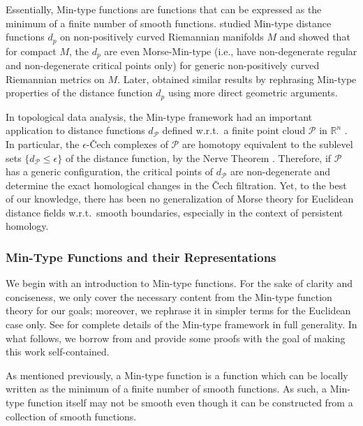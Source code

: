 \documentclass[11pt]{article}
\newcommand{\R}{\mathbb{R}}
\newcommand{\eps}{\epsilon}
\theoremstyle{plain}
\theoremstyle{definition}
\theoremstyle{remark}
\begin{document}
	Essentially, Min-type functions are functions that can be expressed as the minimum of a finite number of smooth functions.
	\cite{gershkovich_morse_1997} studied Min-type distance functions $d_p$ on non-positively curved Riemannian manifolds $M$ and showed that for compact $M$, the $d_p$ are even Morse-Min-type (i.e., have non-degenerate regular and non-degenerate critical points only) for generic non-positively curved Riemannian metrics on $M$.
	Later, \cite{itoh_cut_2007} obtained similar results by rephrasing Min-type properties of the distance function $d_p$ using more direct geometric arguments.
	
	In topological data analysis, the Min-type framework had an important application to distance functions $d_{\mathcal{P}}$ defined w.r.t.~a finite point cloud $\mathcal{P}$ in  $\R^n$ \citep{bobrowski_distance_2014}. In particular,
	the $\eps$-\v{C}ech complexes of $\mathcal{P}$ are homotopy equivalent to the sublevel sets $\{d_{\mathcal{P}} \leq \eps \}$ of the distance function, by the Nerve Theorem \citep{borsuk_imbedding_1948}. Therefore, if $\mathcal{P}$ has a generic configuration, the critical points of $d_{\mathcal{P}}$ are non-degenerate and determine the exact homological changes in the \v{C}ech filtration.
	Yet, to the best of our knowledge, there has been no generalization of Morse theory for Euclidean distance fields w.r.t.~smooth boundaries, especially in the context of persistent homology.
	
	
	\subsubsection{Min-Type Functions and their Representations}
	
	We begin with an introduction to Min-type functions. For the sake of clarity and conciseness, we only cover the necessary content from the Min-type function theory for our goals; moreover, we rephrase it in simpler terms for the Euclidean case only. See \citep{gershkovich_morse_1997} for complete details of the Min-type framework in full generality.  In what follows, we borrow from \citep{gershkovich_morse_1997} and provide some proofs with the goal of making this work self-contained.
	
	As mentioned previously, a Min-type function is a function which can be locally written as the minimum of a finite number of smooth functions. As such, a Min-type function itself may not be smooth even though it can be constructed from a collection of smooth functions. 
	
\end{document}
